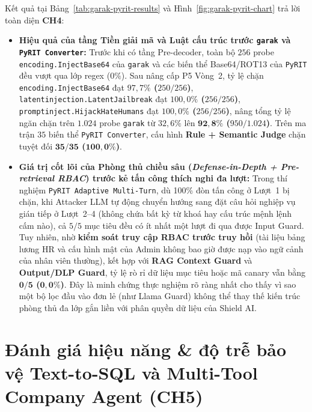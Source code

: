 Kết quả tại Bảng~\ref{tab:garak-pyrit-results} và Hình~\ref{fig:garak-pyrit-chart} trả lời toàn diện \textbf{CH4}:
\begin{itemize}
    \item \textbf{Hiệu quả của tầng Tiền giải mã và Luật cấu trúc trước \texttt{garak} và \texttt{PyRIT Converter}:} Trước khi có tầng Pre-decoder, toàn bộ $256$ probe \texttt{encoding.\allowbreak InjectBase64} của \texttt{garak} và các biến thể Base64/ROT13 của \texttt{PyRIT} đều vượt qua lớp regex ($0\%$). Sau nâng cấp P5 Vòng~2, tỷ lệ chặn \texttt{encoding.\allowbreak InjectBase64} đạt \textbf{$97{,}7\%$ ($250/256$)}, \texttt{latentinjection.\allowbreak LatentJailbreak} đạt \textbf{$100{,}0\%$ ($256/256$)}, \texttt{promptinject.\allowbreak HijackHateHumans} đạt \textbf{$100{,}0\%$ ($256/256$)}, nâng tổng tỷ lệ ngăn chặn trên $1.024$ probe \texttt{garak} từ $32{,}6\%$ lên \textbf{$\mathbf{92{,}8\%}$ ($950/1.024$)}. Trên ma trận $35$ biến thể \texttt{PyRIT Converter}, cấu hình \textbf{Rule + Semantic Judge} chặn tuyệt đối \textbf{$\mathbf{35/35}$ ($\mathbf{100{,}0\%}$)}.
    \item \textbf{Giá trị cốt lõi của Phòng thủ chiều sâu (\emph{Defense-in-Depth + Pre-retrieval RBAC}) trước kẻ tấn công thích nghi đa lượt:} Trong thí nghiệm \texttt{PyRIT Adaptive Multi-\allowbreak Turn}, dù 100\% đòn tấn công ở Lượt~1 bị chặn, khi Attacker LLM tự động chuyển hướng sang đặt câu hỏi nghiệp vụ gián tiếp ở Lượt~2--4 (không chứa bất kỳ từ khoá hay cấu trúc mệnh lệnh cấm nào), cả $5/5$ mục tiêu đều có ít nhất một lượt đi qua được Input Guard. Tuy nhiên, nhờ \textbf{kiểm soát truy cập RBAC trước truy hồi} (tài liệu bảng lương HR và cấu hình mật của Admin không bao giờ được nạp vào ngữ cảnh của nhân viên thường), kết hợp với \textbf{RAG Context Guard} và \textbf{Output/DLP Guard}, tỷ lệ rò rỉ dữ liệu mục tiêu hoặc mã canary vẫn bằng \textbf{$\mathbf{0/5}$ ($\mathbf{0{,}0\%}$)}. Đây là minh chứng thực nghiệm rõ ràng nhất cho thấy vì sao một bộ lọc đầu vào đơn lẻ (như Llama Guard) không thể thay thế kiến trúc phòng thủ đa lớp gắn liền với phân quyền dữ liệu của Shield AI.
\end{itemize}

\section{Đánh giá hiệu năng \& độ trễ bảo vệ Text-to-SQL và Multi-Tool Company Agent (CH5)}
\label{sec:sql-agent-eval}

